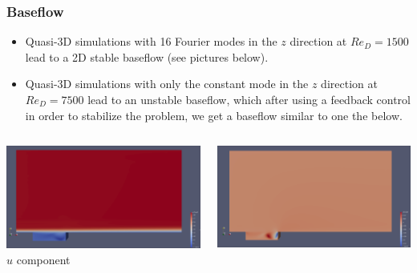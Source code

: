 \documentclass[
	aspectratio=169, %
	t, %
	onlytextwidth, %
	10pt, %
]{beamer}
\begin{document}
\begin{frame}
	\frametitle{Baseflow}

	\small %
	\begin{itemize}
		\item Quasi-3D simulations with 16 Fourier modes in the $z$ direction at $Re_D = 1500$ lead to a 2D stable baseflow (see pictures below).
		\item Quasi-3D simulations with only the constant mode in the $z$ direction at $Re_D = 7500$ lead to an unstable baseflow, which after using a feedback control in order to stabilize the problem, we get a baseflow similar to one the below.

	\end{itemize}
	\begin{columns}[T] %
		\begin{column}{0.3\linewidth} %
			\includegraphics[width=\linewidth]{Images/baseflowU.png}\\[3pt]
			{\tiny\textcolor{ICLBlue}{$u$ component}}
		\end{column}
		\begin{column}{0.3\linewidth} %
			\includegraphics[width=\linewidth]{Images/baseflowV.png}\\[3pt]

\end{column}
\end{columns}
\end{frame}
\end{document}
